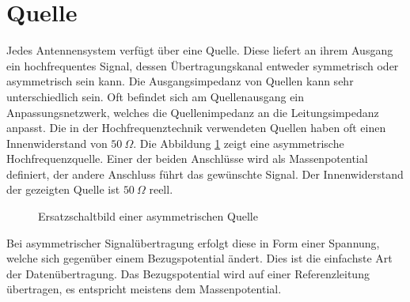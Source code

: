 \section{Quelle}
Jedes Antennensystem verfügt über eine Quelle. Diese liefert an ihrem Ausgang ein hochfrequentes Signal, dessen Übertragungskanal entweder symmetrisch oder asymmetrisch sein kann. Die Ausgangsimpedanz von Quellen kann sehr unterschiedlich sein. Oft befindet sich am Quellenausgang ein Anpassungsnetzwerk, welches die Quellenimpedanz an die Leitungsimpedanz anpasst. Die in der Hochfrequenztechnik verwendeten Quellen haben oft einen Innenwiderstand von $50\ \Omega$. Die Abbildung \ref{fig:asymmetrischeQuelle} zeigt eine asymmetrische  Hochfrequenzquelle. Einer der beiden Anschlüsse wird als Massenpotential definiert, der andere Anschluss führt das gewünschte Signal. Der Innenwiderstand der gezeigten Quelle ist $50\ \Omega$ reell.
\begin{figure}[!th]
	\begin{center}
	\end{center}
\caption{Ersatzschaltbild einer asymmetrischen Quelle}
\label{fig:asymmetrischeQuelle}
\end{figure}
Bei asymmetrischer Signalübertragung erfolgt diese in Form einer Spannung, welche sich gegenüber einem Bezugspotential ändert. Dies ist die einfachste Art der Datenübertragung. Das Bezugspotential wird auf einer Referenzleitung übertragen, es entspricht meistens dem Massenpotential. \\

